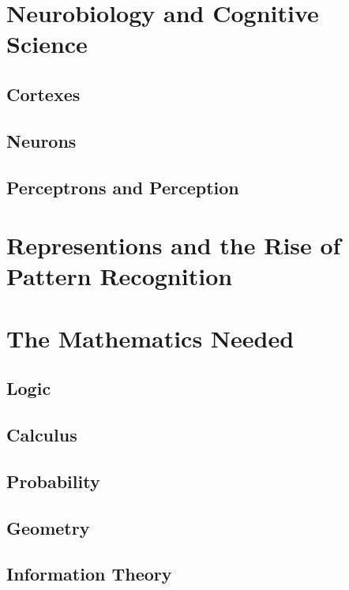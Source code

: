 \documentclass[]{book}
\theoremstyle{definition}
\theoremstyle{definition}
\theoremstyle{definition}
\theoremstyle{remark}
\begin{document}
\section{Neurobiology and Cognitive
Science}\label{neurobiology-and-cognitive-science}

\subsection{Cortexes}\label{cortexes}

\subsection{Neurons}\label{neurons}

\subsection{Perceptrons and
Perception}\label{perceptrons-and-perception}

\section{Representions and the Rise of Pattern
Recognition}\label{representions-and-the-rise-of-pattern-recognition}

\section{The Mathematics Needed}\label{the-mathematics-needed}

\subsection{Logic}\label{logic}

\subsection{Calculus}\label{calculus}

\subsection{Probability}\label{probability-1}

\subsection{Geometry}\label{geometry}

\subsection{Information Theory}\label{information-theory-1}
\end{document}
